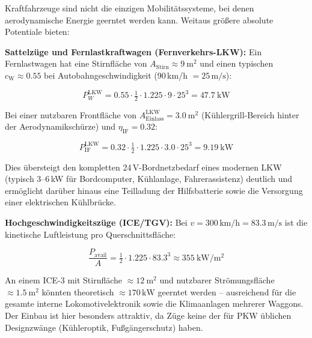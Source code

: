 ﻿\documentclass[12pt, a4paper]{report}
\theoremstyle{definition}
\theoremstyle{remark}
\newcommand{\cW}{c_{\text{W}}}
\newcommand{\Astirnfl}{A_{\text{Stirn}}}
\newcommand{\Aeinlass}{A_{\text{Einlass}}}
\begin{document}
Kraftfahrzeuge sind nicht die einzigen Mobilitätssysteme, bei denen aerodynamische
Energie geerntet werden kann. Weitaus größere absolute Potentiale bieten:

\textbf{Sattelzüge und Fernlastkraftwagen (Fernverkehrs-LKW):}
Ein Fernlast\-wagen hat eine Stirnfläche von $\Astirnfl \approx \SI{9}{\metre\squared}$
und einen typischen $\cW \approx 0.55$ bei Autobahngeschwindigkeit
(90\,km/h $= 25\,\text{m/s}$):

\begin{equation}
  P_W^{\text{LKW}} = 0.55 \cdot \tfrac{1}{2} \cdot 1.225 \cdot 9 \cdot 25^3
  = \SI{47.7}{\kilo\watt}
  \label{eq:pw_lkw}
\end{equation}

Bei einer nutzbaren Frontfläche von $\Aeinlass^{\text{LKW}} = \SI{3.0}{\metre\squared}$
(Kühlergrill-Bereich hinter der Aerodynamikschürze) und $\eta_{\text{IF}} = 0.32$:

\begin{equation}
  P_{\text{IF}}^{\text{LKW}} = 0.32 \cdot \tfrac{1}{2} \cdot 1.225 \cdot 3.0 \cdot 25^3
  = \SI{9.19}{\kilo\watt}
  \label{eq:p_if_lkw}
\end{equation}

Dies übersteigt den kompletten 24\,V-Bordnetz\-bedarf eines modernen LKW
(typisch 3--6\,kW für Bordcomputer, Kühlanlage, Fahrerassistenz) deutlich
und ermöglicht darüber hinaus eine Teilladung der Hilfsbatterie sowie die
Versorgung einer elektrischen Kühlbrücke.

\textbf{Hochgeschwindigkeitszüge (ICE/TGV):}
Bei $v = 300\,\text{km/h} = 83.3\,\text{m/s}$ ist die kinetische Luftleistung
pro Querschnittsfläche:

\begin{equation}
  \frac{P_{\text{avail}}}{A} = \tfrac{1}{2} \cdot 1.225 \cdot 83.3^3
  \approx \SI{355}{\kilo\watt\per\metre\squared}
  \label{eq:p_avail_zug}
\end{equation}

An einem ICE-3 mit Stirnfläche $\approx \SI{12}{\metre\squared}$ und
nutzbarer Strömungsfläche $\approx \SI{1.5}{\metre\squared}$ könnten
theoretisch $\approx 170\,\text{kW}$ geerntet werden -- ausreichend für
die gesamte interne Lokomotivelektronik sowie die Klimaanlagen mehrerer
Waggons. Der Einbau ist hier besonders attraktiv, da Züge keine der
für PKW üblichen Designzwänge (Kühleroptik, Fußgängerschutz) haben.

\end{document}
